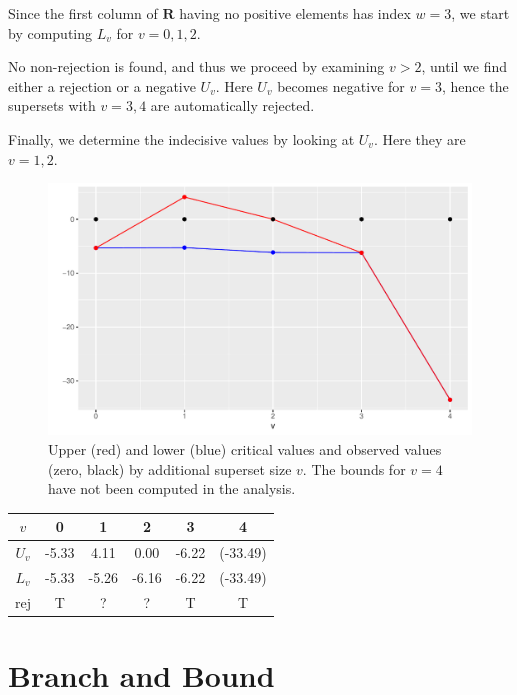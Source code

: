 \documentclass[11pt,a4paper,openright,twoside]{article}
\begin{document}
Since the first column of $\mathbf{R}$ having no positive elements has index $w=3$, we start by computing $L_v$ for $v=0,1,2$.

No non-rejection is found, and thus we proceed by examining $v>2$, until we find either a rejection or a negative $U_v$. Here $U_v$ becomes negative for $v=3$, hence the supersets with $v=3,4$ are automatically rejected.

Finally, we determine the indecisive values by looking at $U_v$. Here they are $v=1,2$.

\begin{figure}[h!]
\centering
\includegraphics[scale=0.6]{plot1.pdf}
\caption{Upper (red) and lower (blue) critical values and observed values (zero, black) by additional superset size $v$. The bounds for $v=4$ have not been computed in the analysis.}
\end{figure}


\begin{table}[h!]
\centering
\begin{tabular}{cccccc}
\toprule
$v$ & 0 & 1 & 2 & 3 & 4\\
\midrule
$U_v$ & -5.33 & 4.11 & 0.00 & -6.22 & (-33.49)\\
$L_v$ & -5.33 & -5.26 & -6.16 & -6.22 & (-33.49)\\
\midrule
rej & T & ? & ? & T & T\\
\bottomrule
\end{tabular}
\end{table}


\newpage
\section{Branch and Bound}
\end{document}
